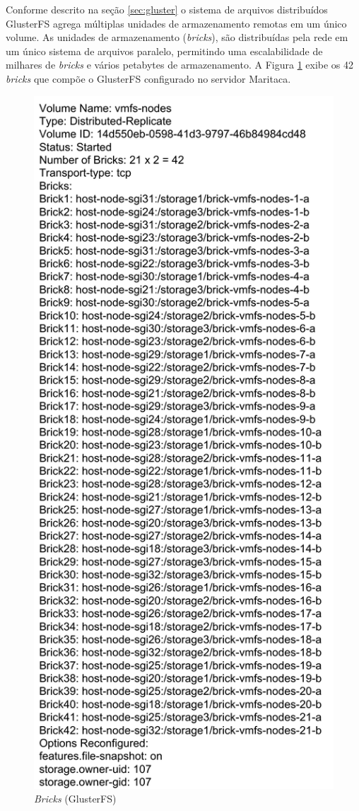 Conforme descrito na seção \ref{sec:gluster} o sistema de arquivos distribuídos GlusterFS agrega múltiplas unidades de armazenamento remotas em um único volume. As unidades de armazenamento (\textit{bricks}), são distribuídas pela rede em um único sistema de arquivos paralelo, permitindo uma escalabilidade de milhares de \textit{bricks} e vários petabytes de armazenamento. A Figura \ref{fig:vmfs} exibe os 42 \textit{bricks} que compõe o GlusterFS configurado no servidor Maritaca. 
    \begin{figure}[htb]
    \centering
    \includegraphics[scale=0.7]{imagens/vmfsnodes.pdf}
    \caption{\textit{Bricks} (GlusterFS)}
    \label{fig:vmfs}
    \end{figure}